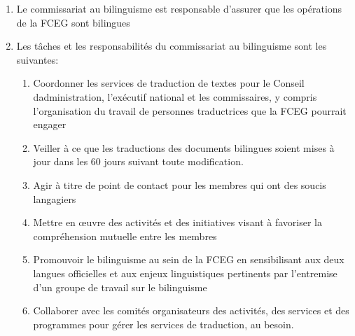 \begin{enumerate}
 \item
  Le commissariat au bilinguisme est responsable d’assurer que les opérations de la FCEG sont bilingues
 \item
  Les tâches et les responsabilités du commissariat au bilinguisme sont les suivantes:

  \begin{enumerate}
   \item
    Coordonner les services de traduction de textes pour le Conseil d\textquotesingle administration, l’exécutif national et les commissaires, y compris l’organisation du travail de personnes traductrices que la FCEG pourrait engager
   \item
    Veiller à ce que les traductions des documents bilingues soient mises à jour dans les 60 jours suivant toute modification.
   \item
    Agir à titre de point de contact pour les membres qui ont des soucis langagiers
   \item
    Mettre en œuvre des activités et des initiatives visant à favoriser la compréhension mutuelle entre les membres
   \item
    Promouvoir le bilinguisme au sein de la FCEG en sensibilisant aux deux langues officielles et aux enjeux linguistiques pertinents par l’entremise d’un groupe de travail sur le bilinguisme
   \item
    Collaborer avec les comités organisateurs des activités, des services et des programmes pour gérer les services de traduction, au besoin.
  \end{enumerate}
\end{enumerate}
